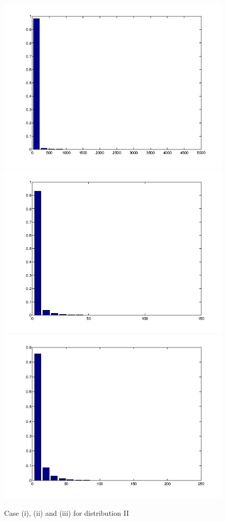 \begin{figure}[!htbp]
  \includegraphics[width=\textwidth/2]{p2/gen.png}
    \includegraphics[width=\textwidth/2]{p2/pop.png}
  \includegraphics[width=\textwidth/1]{p2/largest.png}
  \caption{Case (i), (ii) and (iii) for distribution II}
  \label{II}
\end{figure}


